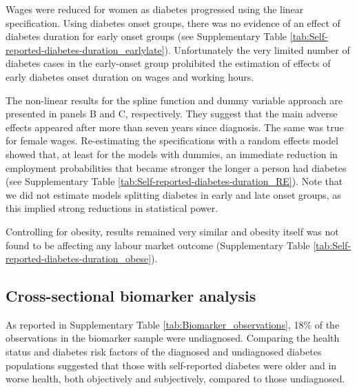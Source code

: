 \documentclass[12pt,english]{article}
\begin{document}
Wages were reduced for women as diabetes progressed using the linear specification. Using diabetes onset groups, there was no evidence of an effect of diabetes duration for early onset groups (see Supplementary Table \ref{tab:Self-reported-diabetes-duration_earlylate}). Unfortunately the very limited number of diabetes cases in the early-onset group prohibited the estimation of effects of early diabetes onset duration on wages and working hours.


The non-linear results for the spline function and dummy variable approach are  presented in panels B and C, respectively. They suggest that the main adverse effects appeared after more than seven years since diagnosis. The same was true for female wages. Re-estimating the specifications with a random effects model showed that, at least for the models with dummies, an immediate reduction in employment probabilities that became stronger the longer a person had diabetes (see Supplementary Table \ref{tab:Self-reported-diabetes-duration_RE}). Note that we did not estimate models splitting diabetes in early and late onset groups, as this implied strong reductions in statistical power.

Controlling for obesity, results remained very similar and obesity itself was not found to be affecting any labour market outcome (Supplementary Table \ref{tab:Self-reported-diabetes-duration_obese}).



\FloatBarrier

\subsection{Cross-sectional biomarker analysis}


As reported in Supplementary Table \ref{tab:Biomarker_observations}, 18\% of the observations in the biomarker sample were undiagnosed. Comparing the health status and diabetes risk factors of the diagnosed and undiagnosed diabetes populations suggested that those with self-reported diabetes were older and in worse health, both objectively and subjectively, compared to those undiagnosed.
\end{document}
